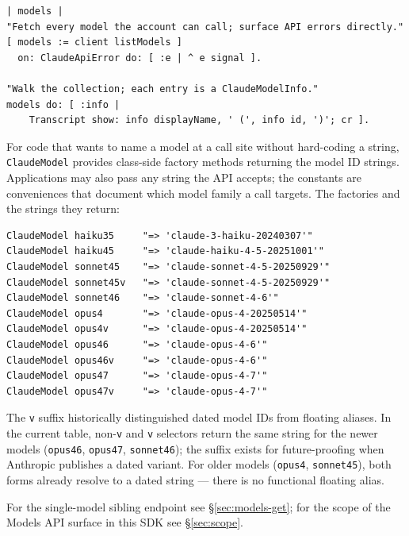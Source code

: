 \documentclass[a4paper,10pt,fleqn]{article}
\begin{document}
\begin{lstlisting}[language={},title={List available models}]
| models |
"Fetch every model the account can call; surface API errors directly."
[ models := client listModels ]
  on: ClaudeApiError do: [ :e | ^ e signal ].

"Walk the collection; each entry is a ClaudeModelInfo."
models do: [ :info |
    Transcript show: info displayName, ' (', info id, ')'; cr ].
\end{lstlisting}

For code that wants to name a model at a call site without
hard-coding a string, \texttt{ClaudeModel} provides class-side
factory methods returning the model ID strings.  Applications may
also pass any string the API accepts; the constants are
conveniences that document which model family a call targets.  The
factories and the strings they return:

\begin{lstlisting}[language={},title={Model constants}]
ClaudeModel haiku35     "=> 'claude-3-haiku-20240307'"
ClaudeModel haiku45     "=> 'claude-haiku-4-5-20251001'"
ClaudeModel sonnet45    "=> 'claude-sonnet-4-5-20250929'"
ClaudeModel sonnet45v   "=> 'claude-sonnet-4-5-20250929'"
ClaudeModel sonnet46    "=> 'claude-sonnet-4-6'"
ClaudeModel opus4       "=> 'claude-opus-4-20250514'"
ClaudeModel opus4v      "=> 'claude-opus-4-20250514'"
ClaudeModel opus46      "=> 'claude-opus-4-6'"
ClaudeModel opus46v     "=> 'claude-opus-4-6'"
ClaudeModel opus47      "=> 'claude-opus-4-7'"
ClaudeModel opus47v     "=> 'claude-opus-4-7'"
\end{lstlisting}

The \texttt{v} suffix historically distinguished dated model IDs
from floating aliases.  In the current table, non-\texttt{v} and
\texttt{v} selectors return the same string for the newer models
(\texttt{opus46}, \texttt{opus47}, \texttt{sonnet46}); the suffix
exists for future-proofing when Anthropic publishes a dated
variant.  For older models (\texttt{opus4}, \texttt{sonnet45}),
both forms already resolve to a dated string --- there is no
functional floating alias.

For the single-model sibling endpoint see \S\ref{sec:models-get};
for the scope of the Models API surface in this SDK see
\S\ref{sec:scope}.

\medskip
{}
\end{document}
